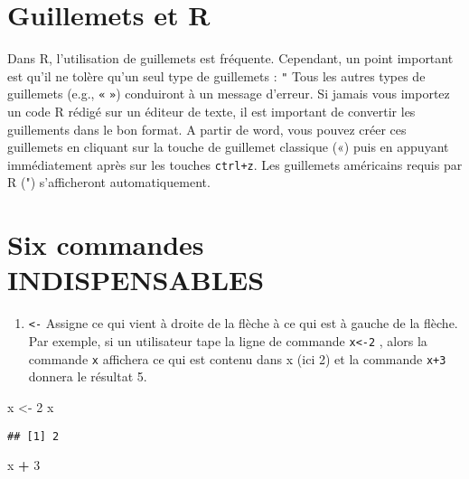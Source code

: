 \documentclass[
]{book}
\newenvironment{Shaded}{\begin{snugshade}}{\end{snugshade}}
\newcommand{\DecValTok}[1]{\textcolor[rgb]{0.00,0.00,0.81}{#1}}
\newcommand{\NormalTok}[1]{#1}
\newcommand{\OperatorTok}[1]{\textcolor[rgb]{0.81,0.36,0.00}{\textbf{#1}}}
\newcommand{\StringTok}[1]{\textcolor[rgb]{0.31,0.60,0.02}{#1}}
\providecommand{\tightlist}{%
  \setlength{\itemsep}{0pt}\setlength{\parskip}{0pt}}
\begin{document}
\hypertarget{guillemets-et-r}{%
\section{Guillemets et R}\label{guillemets-et-r}}

Dans R, l'utilisation de guillemets est fréquente. Cependant, un point important est qu'il ne tolère qu'un seul type de guillemets : \texttt{"}
Tous les autres types de guillemets (e.g., \texttt{«} \texttt{»}) conduiront à un message d'erreur.
Si jamais vous importez un code R rédigé sur un éditeur de texte, il est important de convertir les guillements dans le bon format. A partir de word, vous pouvez créer ces guillemets en cliquant sur la touche de guillemet classique («) puis en appuyant immédiatement après sur les touches \texttt{ctrl+z}. Les guillemets américains requis par R (") s'afficheront automatiquement.

\hypertarget{six-commandes-indispensables}{%
\section{Six commandes INDISPENSABLES}\label{six-commandes-indispensables}}

\begin{enumerate}
\def\labelenumi{\arabic{enumi}.}
\tightlist
\item
  \texttt{\textless{}-} Assigne ce qui vient à droite de la flèche à ce qui est à gauche de la flèche. Par exemple, si un utilisateur tape la ligne de commande \texttt{x\textless{}-2} , alors la commande \texttt{x} affichera ce qui est contenu dans x (ici 2) et la commande \texttt{x+3} donnera le résultat 5. 
\end{enumerate}

\begin{Shaded}
\begin{Highlighting}[]
\NormalTok{x <-}\StringTok{ }\DecValTok{2}
\NormalTok{x}
\end{Highlighting}
\end{Shaded}

\begin{verbatim}
## [1] 2
\end{verbatim}

\begin{Shaded}
\begin{Highlighting}[]
\NormalTok{x }\OperatorTok{+}\StringTok{ }\DecValTok{3}
\end{Highlighting}
\end{Shaded}
\end{document}
